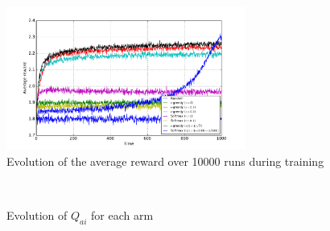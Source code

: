\documentclass[a4paper]{article}
\begin{document}
\begin{figure}[H]
	\centering
	\includegraphics[width=0.7\textwidth]{./fig/ex1-3.pdf}
	\caption{Evolution of the average reward over 10000 runs during training}
	\label{ex13perf}
\end{figure}
\begin{figure}[H]
	\centering
	\\
	\caption{Evolution of $Q_{ai}$ for each arm}
	\label{ex13q}
\end{figure}
\end{document}
